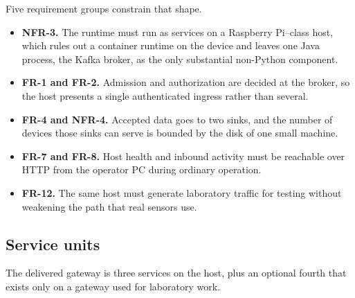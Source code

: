 \documentclass[12pt,a4paper]{report}
\begin{document}
Five requirement groups constrain that shape.

\begin{itemize}
    \item \textbf{NFR-3.}
    The runtime must run as services on a Raspberry Pi--class
    host, which rules out a container runtime on the device and
    leaves one Java process, the Kafka broker, as the only
    substantial non-Python component.
    \item \textbf{FR-1 and FR-2.}
    Admission and authorization are decided at the broker, so the
    host presents a single authenticated ingress rather than
    several.
    \item \textbf{FR-4 and NFR-4.}
    Accepted data goes to two sinks, and the number of devices
    those sinks can serve is bounded by the disk of one small
    machine.
    \item \textbf{FR-7 and FR-8.}
    Host health and inbound activity must be reachable over HTTP
    from the operator PC during ordinary operation.
    \item \textbf{FR-12.}
    The same host must generate laboratory traffic for testing
    without weakening the path that real sensors use.
\end{itemize}

\subsection{Service units}
\label{sec:gw-units}

The delivered gateway is three services on the host, plus an
optional fourth that exists only on a gateway used for laboratory
work.
\end{document}
